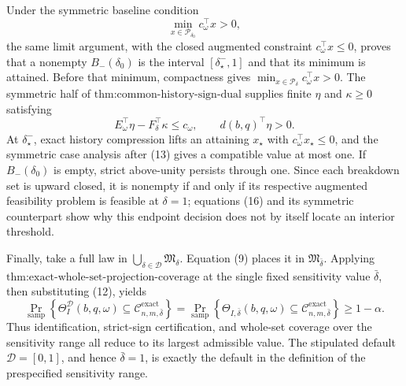 Under the symmetric baseline condition
\[
 \min_{x\in\mathcal P_{\delta_0}}c_\omega^{\top}x>0,
\tag{19}
\]
the same limit argument, with the closed augmented constraint \(c_\omega^{\top}x\leq0\), proves that a nonempty \(B_-(\delta_0)\) is the interval \([\delta_\star^-,1]\) and that its minimum is attained.  Before that minimum, compactness gives \(\min_{x\in\mathcal P_\delta}c_\omega^{\top}x>0\).  The symmetric half of \(\text{thm:common-history-sign-dual}\) supplies finite \(\eta\) and \(\kappa\geq0\) satisfying
\[
 E_\omega^{\top}\eta-F_\delta^{\top}\kappa\leq c_\omega,
 \qquad d(b,q)^{\top}\eta>0.
\tag{20}
\]
At \(\delta_\star^-\), exact history compression lifts an attaining \(x_\star\) with \(c_\omega^{\top}x_\star\leq0\), and the symmetric case analysis after (13) gives a compatible value at most one.  If \(B_-(\delta_0)\) is empty, strict above-unity persists through one.  Since each breakdown set is upward closed, it is nonempty if and only if its respective augmented feasibility problem is feasible at \(\delta=1\); equations (16) and its symmetric counterpart show why this endpoint decision does not by itself locate an interior threshold.

Finally, take a full law in \(\bigcup_{\delta\in\mathcal D}\mathfrak M_\delta\).  Equation (9) places it in \(\mathfrak M_{\bar\delta}\).  Applying \(\text{thm:exact-whole-set-projection-coverage}\) at the single fixed sensitivity value \(\bar\delta\), then substituting (12), yields
\[
 \Pr_{\mathrm{samp}}\!\left\{
 \Theta_I^{\mathcal D}(b,q,\omega)
 \subseteq\mathcal C_{n,m,\bar\delta}^{\mathrm{exact}}
 \right\}
 =
 \Pr_{\mathrm{samp}}\!\left\{
 \Theta_{I,\bar\delta}(b,q,\omega)
 \subseteq\mathcal C_{n,m,\bar\delta}^{\mathrm{exact}}
 \right\}
 \geq1-\alpha.
\tag{21}
\]
Thus identification, strict-sign certification, and whole-set coverage over the sensitivity range all reduce to its largest admissible value.  The stipulated default \(\mathcal D=[0,1]\), and hence \(\bar\delta=1\), is exactly the default in the definition of the prespecified sensitivity range.
